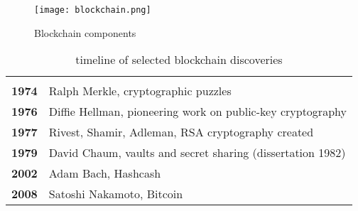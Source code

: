 \documentclass[12pt]{article}
\begin{document}
\begin{figure}
\texttt{[image: blockchain.png]}
\caption{Blockchain components}
\end{figure}

\begin{table}
\begin{tabular}{|c || l|}
\hline
\hspace{5em}&\hspace{5em}\\
\textbf{1974} & Ralph Merkle, cryptographic puzzles \\
\textbf{1976} & Diffie Hellman, pioneering work on public-key cryptography\\
\textbf{1977} & Rivest, Shamir, Adleman, RSA cryptography created\\
\textbf{1979} & David Chaum, vaults and secret sharing (dissertation 1982)\\
\textbf{2002} & Adam Bach, Hashcash \\
\textbf{2008} & Satoshi Nakamoto, Bitcoin\\
\hline
\end{tabular}
\caption{timeline of selected blockchain discoveries}
\label{table:table-1}
\end{table}
\end{document}
